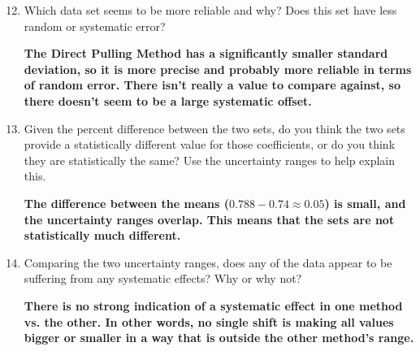\begin{enumerate}
	\setcounter{enumi}{11}
	\item Which data set seems to be more reliable and why?  Does this set have less random or systematic error?

	      \textbf{The Direct Pulling Method has a significantly smaller standard deviation, so it is more precise and probably more reliable in terms of random error. There isn't really a value to compare against, so there doesn't seem to be a large systematic offset.}

	\item Given the percent difference between the two sets, do you think the two sets provide a statistically different value for those coefficients, or do you think they are statistically the same? Use the uncertainty ranges to help explain this.

	      \textbf{The difference between the means ($0.788-0.74 \approx 0.05$) is small, and the uncertainty ranges overlap. This means that the sets are not statistically much different.}

	\item Comparing the two uncertainty ranges, does any of the data appear to be suffering from any systematic effects?  Why or why not?

	      \textbf{There is no strong indication of a systematic effect in one method vs. the other. In other words, no single shift is making all values bigger or smaller in a way that is outside the other method's range.}
\end{enumerate}

